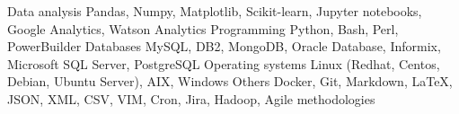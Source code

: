 %
%
%

    \begin{keywords}
        \keywordsentry
            {Data analysis}
            {
                Pandas,
                Numpy,
                Matplotlib,
                Scikit-learn,
                Jupyter notebooks,
                Google Analytics,
                Watson Analytics
            }
        \keywordsentry
            {Programming}
            {
                Python,
                Bash,
                Perl,
                PowerBuilder
            }
        \keywordsentry
            {Databases}
            {
                MySQL,
                DB2,
                MongoDB,
                Oracle Database, 
                Informix,
                Microsoft SQL Server,
                PostgreSQL
            }
        \keywordsentry
            {Operating systems}
            {
                Linux (Redhat, Centos, Debian, Ubuntu Server),
                AIX,
                Windows
            }
        \keywordsentry
            {Others}
            {
            	Docker,
                Git,
                Markdown,
                \LaTeX,
                JSON,
                XML,
                CSV,
                VIM,
                Cron,
                Jira,
                Hadoop,
                Agile methodologies
            }
    \end{keywords}
